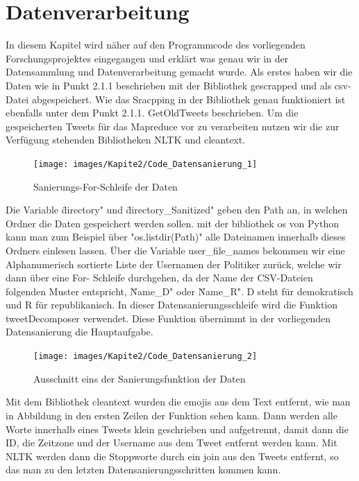 \section{Datenverarbeitung}
	
	In diesem Kapitel wird näher auf den Programmcode des vorliegenden Forschungsprojektes eingegangen und erklärt was genau wir in der Datensammlung und 
	Datenverarbeitung gemacht wurde. 
	Als erstes haben wir die Daten wie in Punkt 2.1.1 beschrieben mit der Bibliothek gescrapped und als csv-Datei abgespeichert. Wie das Sracpping in der 
	Bibliothek genau funktioniert ist ebenfalls unter dem Punkt 2.1.1. GetOldTweets beschrieben. Um die gespeicherten Tweets für das Mapreduce vor zu 
	verarbeiten nutzen wir die zur Verfügung stehenden Bibliotheken NLTK und cleantext.
	
	
	\begin{figure}[ht]
		\centering
		\texttt{[image: images/Kapite2/Code\_Datensanierung\_1]}
		\caption{\label{fig:DataSan}Sanierungs-For-Schleife der Daten}
	\end{figure}
	
	Die Variable \"directory" und \"directory_Sanitized" geben den Path an, in welchen Ordner die Daten gespeichert werden sollen. mit der bibliothek os von Python 
	kann man zum Beispiel über "os.listdir(Path)" alle Dateinamen innerhalb dieses Ordners einlesen lassen. 
	Über die Variable user_file_names bekommen wir eine Alphanumerisch sortierte Liste der Usernamen der Politiker zurück, welche wir dann über eine For-
	Schleife durchgehen, da der Name der CSV-Dateien folgenden Muster entspricht, \"Name_D" oder \"Name_R". D steht für demokratisch und R für 
	republikanisch. In dieser Datensanierungsschleife wird die Funktion tweetDecomposer verwendet. Diese Funktion übernimmt in der vorliegenden Datensanierung die 
	Hauptaufgabe.
	
	\begin{figure}[ht]
		\centering
		\texttt{[image: images/Kapite2/Code\_Datensanierung\_2]}
		\caption{\label{fig:DataSanF1}Ausschnitt eins der Sanierungsfunktion der Daten}
	\end{figure}
	
	Mit dem Bibliothek cleantext wurden die emojis aus dem Text entfernt, wie man in Abbildung \label{DataSanF1} in den ersten Zeilen der Funktion sehen kann.
	Dann werden alle Worte innerhalb eines Tweets klein geschrieben und aufgetrennt, damit dann  die ID, die Zeitzone und der Username aus dem Tweet entfernt 
	werden kann. Mit NLTK werden dann die Stoppworte durch ein join aus den Tweets entfernt, so das man zu den letzten Datensanierungsschritten kommen kann.
	 
